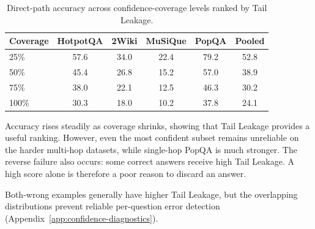 \begin{table}[h]
    \centering
    \caption[Direct-Path Accuracy by Confidence Coverage]{Direct-path accuracy across confidence-coverage levels ranked by Tail Leakage.}
    \label{tab:tail-leakage-selective}
    \setlength{\tabcolsep}{8pt}
    \small
    \begin{tabular}{ l c c c c c }
        \toprule
        Coverage & HotpotQA & 2Wiki & MuSiQue & PopQA & Pooled \\
        \midrule
        25\% & 57.6 & 34.0 & 22.4 & 79.2 & 52.8 \\
        50\% & 45.4 & 26.8 & 15.2 & 57.0 & 38.9 \\
        75\% & 38.0 & 22.1 & 12.5 & 46.3 & 30.2 \\
        100\% & 30.3 & 18.0 & 10.2 & 37.8 & 24.1 \\
        \bottomrule
    \end{tabular}
\end{table}

Accuracy rises steadily as coverage shrinks, showing that Tail Leakage provides a useful ranking. However, even the most confident subset remains unreliable on the harder multi-hop datasets, while single-hop PopQA is much stronger. The reverse failure also occurs: some correct answers receive high Tail Leakage. A high score alone is therefore a poor reason to discard an answer.

Both-wrong examples generally have higher Tail Leakage, but the overlapping distributions prevent reliable per-question error detection (Appendix~\ref{app:confidence-diagnostics}).
